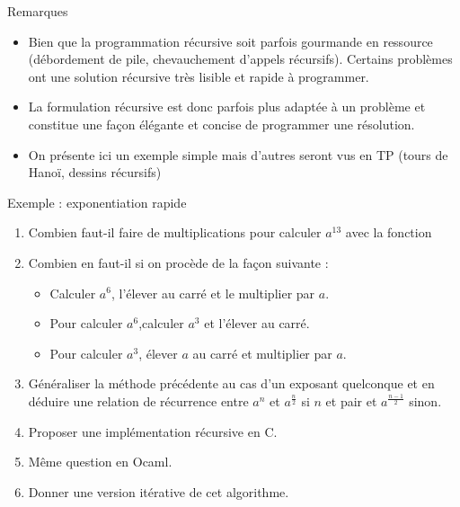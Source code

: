 \documentclass[10pt]{beamer}
\begin{document}
\begin{frame}[fragile]{\Ctitle}{\stitle}
	\begin{block}{Remarques}
		\begin{itemize}
			\item<1->Bien que la programmation récursive soit parfois gourmande en ressource (débordement de pile, chevauchement d'appels récursifs). Certains problèmes ont une solution récursive très lisible et rapide à programmer.
			\item<2-> La formulation récursive est donc parfois \og plus adaptée \fg{} à un problème et constitue une façon \og{}élégante\fg{} et concise de programmer une résolution.
			\item<3-> On présente ici un exemple simple mais d'autres seront vus en TP (tours de Hanoï, dessins récursifs)
		\end{itemize}
	\end{block}
\end{frame}

\begin{frame}[fragile]{\Ctitle}{\stitle}
	\begin{exampleblock}{Exemple : exponentiation rapide}
		\begin{enumerate}
			\item<1-> Combien faut-il faire de multiplications pour calculer $a^{13}$ avec la fonction
			\item<2-> Combien en faut-il si on procède de la façon suivante :
				\begin{itemize}
					\item<3-> Calculer $a^6$, l'élever au carré et le multiplier par $a$.
					\item<4-> Pour calculer $a^6$,calculer $a^3$ et l'élever au carré.
					\item<5-> Pour calculer $a^3$, élever $a$ au carré et multiplier par $a$.
				\end{itemize}
			\item<6-> Généraliser la méthode précédente au cas d'un exposant quelconque et en déduire une relation de récurrence entre $a^n$ et $a^\frac{n}{2}$ si $n$ et pair et $a^\frac{n-1}{2}$ sinon.
			\item<7-> Proposer une implémentation récursive en C.
			\item<7-> Même question en Ocaml.
			\item<8-> Donner une version itérative de cet algorithme.
		\end{enumerate}
	\end{exampleblock}
\end{frame}
\end{document}
